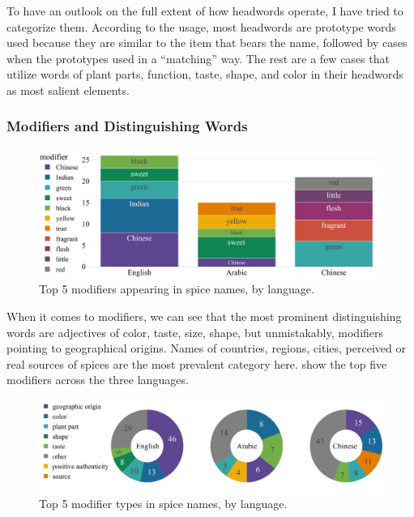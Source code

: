 To have an outlook on the full extent of how headwords operate, I have tried to categorize them. According to the usage, most headwords are prototype words used because they are similar to the item that bears the name, followed by cases when the prototypes used in a ``matching'' way. The rest are a few cases that utilize words of plant parts, function, taste, shape, and color in their headwords as most salient elements.



\subsubsection{Modifiers and Distinguishing Words}

\begin{figure}[ht!]
  \includegraphics[width=\linewidth]{imgs/plots/modifier_bar.pdf}
  \caption{Top 5 modifiers appearing in spice names, by language.}
  \label{fig:modifier_bar}
\end{figure}

When it comes to modifiers, we can see that the most prominent distinguishing words are adjectives of color, taste, size, shape, but unmistakably, modifiers pointing to geographical origins. Names of countries, regions, cities, perceived or real sources of spices are the most prevalent category here.  show the top five modifiers across the three languages. 


\begin{figure}[ht!]
  \includegraphics[width=\linewidth]{imgs/plots/modifier_type_tripie.pdf}
  \caption{Top 5 modifier types in spice names, by language.}
  \label{fig:modifier_type_tripie}
\end{figure}

